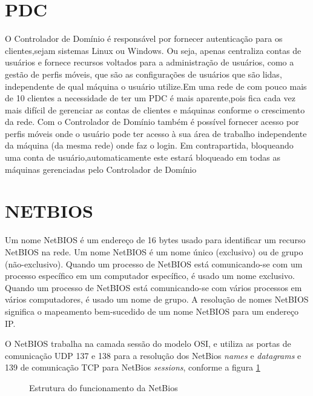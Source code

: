 \section{PDC}

O Controlador de Domínio é responsável por fornecer autenticação para os clientes,sejam sistemas Linux ou Windows. Ou seja, apenas centraliza contas de usuários e fornece recursos voltados para a administração de usuários, como a gestão de perfis móveis, que são as configurações de usuários que são lidas, independente de qual máquina o usuário utilize.Em uma rede de com pouco mais de 10 clientes a necessidade de ter um PDC é mais aparente,pois fica cada vez mais difícil de gerenciar as contas de clientes e máquinas conforme o crescimento da rede. Com o Controlador de Domínio também é possível fornecer acesso por perfis móveis onde o usuário pode ter acesso à sua área de trabalho independente da máquina (da mesma rede) onde faz o login. Em contrapartida, bloqueando uma conta de usuário,automaticamente este estará bloqueado em todas as máquinas gerenciadas pelo Controlador de Domínio \cite{MORIMOTO}

\section{NETBIOS}

Um nome NetBIOS é um endereço de 16 bytes usado para identificar um recurso NetBIOS na rede. Um nome NetBIOS é um nome único (exclusivo) ou de grupo (não-exclusivo). Quando um processo de NetBIOS está comunicando-se com um processo específico em um computador específico, é usado um nome exclusivo. Quando um processo de NetBIOS está comunicando-se com vários processos em vários computadores, é usado um nome de grupo. A resolução de nomes NetBIOS significa o mapeamento bem-sucedido de um nome NetBIOS para um endereço IP.\cite{NETBIOS}

O NetBIOS trabalha na camada sessão do modelo OSI, e utiliza as portas de comunicação UDP 137 e 138 para a resolução dos NetBios \textit{names} e \textit{datagrams} e 139 de comunicação TCP para NetBios \textit{sessions}, conforme a figura \ref{netbios}

\begin{figure}[ht]
   	\centering
   	\caption{Estrutura do funcionamento da NetBios \cite{NETBIOS}}
    \label{netbios}
\end{figure}

